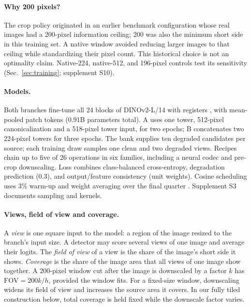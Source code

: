 \documentclass[letterpaper]{article} %
\newcommand{\fov}{\mathrm{FOV}}
\begin{document}
\paragraph{Why 200 pixels?} The crop policy originated in an earlier benchmark configuration whose real images had a 200-pixel information ceiling; 200 was also the minimum short side in this training set. A native window avoided reducing larger images to that ceiling while standardizing their pixel count. This historical choice is not an optimality claim. Native-224, native-512, and 196-pixel controls test its sensitivity (Sec.~\ref{sec:training}; supplement S10).

\paragraph{Models.} Both branches fine-tune all 24 blocks of DINOv2-L/14 with registers \cite{oquab2024dinov2,darcet2024registers}, with mean-pooled patch tokens (0.91B parameters total). A uses one tower, 512-pixel canonicalization and a 518-pixel tower input, for two epochs; B concatenates two 224-pixel towers for three epochs. The bank supplies ten degraded candidates per source; each training draw samples one clean and two degraded views. Recipes chain up to five of 26 operations in six families, including a neural codec \cite{balle2018hyperprior} and pre-crop downscaling. Loss combines class-balanced cross-entropy, degradation prediction (0.3), and output/feature consistency (unit weights). Cosine scheduling uses 3\% warm-up and weight averaging over the final quarter \cite{izmailov2018swa}. Supplement S3 documents sampling and kernels.

\paragraph{Views, field of view and coverage.} A \emph{view} is one
square input to the model: a region of the image resized to the branch's input
size. A detector may score several views of one image and average their
logits. The \emph{field of view} of a view is the share of the image's short
side it shows. \emph{Coverage} is the share of the image area that all views
of one image show together. A 200-pixel window cut after the image is
downscaled by a factor $k$ has $\fov = 200k/h$, provided the window fits.
For a fixed-size window, downscaling widens its field of view and increases
the source area it covers. In our fully tiled construction below, total
coverage is held fixed while the downscale factor varies.
\end{document}
